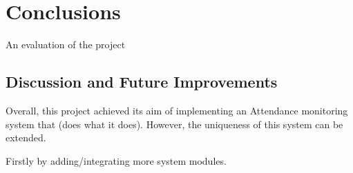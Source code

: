 \chapter{Conclusions}
An evaluation of the project

\section{Discussion and Future Improvements}

Overall, this project achieved its aim of implementing an Attendance monitoring system that (does what it does). However, the uniqueness of this system can be extended.

Firstly by adding/integrating more system modules.